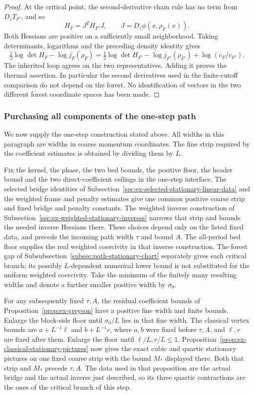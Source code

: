 \begin{proof}
At the critical point, the second-derivative chain rule has no term from
$D_zT_{F'}$, and so
\[
 H_F=J^TH_{F'}J,\qquad J=D_z\phi(x,\rho_F(x)).
\]
Both Hessians are positive on a sufficiently small neighborhood. Taking
determinants, logarithms and the preceding density identity gives
\[
 \tfrac12\log\det H_F-\log j_F(\rho_F)
 =\tfrac12\log\det H_{F'}-\log j_{F'}(\rho_{F'})
                         +\log(c_F/c_{F'}).
\]
The inherited loop agrees on the two representatives. Adding it proves
the thermal assertion. In particular the second derivatives used in the
finite-cutoff comparison do not depend on the forest. No identification
of vectors in the two different forest coordinate spaces has been made.
\end{proof}

\subsubsection{Purchasing all components of the one-step path}
\label{subsec:path-one-step-production}

We now supply the one-step construction stated above. All widths in this
paragraph are widths in coarse momentum coordinates. The fine strip required
by the coefficient estimates is obtained by dividing them by $L$.

Fix the kernel, the phase, the two bed bounds, the positive floor, the
header bound and the two direct-coefficient ceilings in the one-step
interface. The selected bridge identities of
Subsection~\ref{sec:ex-selected-stationary-linear-data} and the weighted frame
and penalty estimates give one common positive coarse strip and fixed
bridge and penalty constants. The weighted inverse construction of
Subsection~\ref{sec:ex-weighted-stationary-inverses} narrows that strip and
bounds the needed inverse Hessians there. These choices depend only on
the listed fixed data, and precede the incoming path width $\tau$ and
bound $A$. The all-period bed floor supplies the real weighted coercivity in that
inverse construction. The forest gap of
Subsubsection~\ref{subsec:path-stationary-chart} separately gives each critical
branch; its possibly $L$-dependent numerical lower bound is not substituted
for the uniform weighted coercivity. Take the minimum of the finitely many
resulting widths and denote a further smaller positive width by $\sigma_0$.

For any subsequently fixed $\tau,A$, the residual coefficient bounds
of Proposition~\ref{prop:ex-greyson} have a positive fine width and finite
bounds. Enlarge the block-side floor until $\sigma_0/L$ lies in that
fine width. The classical vertex bounds are $a+L^{-1}\ell$ and
$b+L^{-1}r$, where $a,b$ were fixed before $\tau,A$, and $\ell,r$
are fixed after them. Enlarge the floor until $\ell/L,r/L\leq1$.
Proposition~\ref{prop:ex-classical-stationary-pictures} now gives the exact
cubic and quartic stationary pictures on one fixed coarse strip with the
bound $M_*$ displayed there. Both that strip and $M_*$ precede $\tau,A$.
The data used in that proposition are the actual bridge and the actual
inverse just described, so its three quartic contractions are the ones of
the critical branch of this step.

